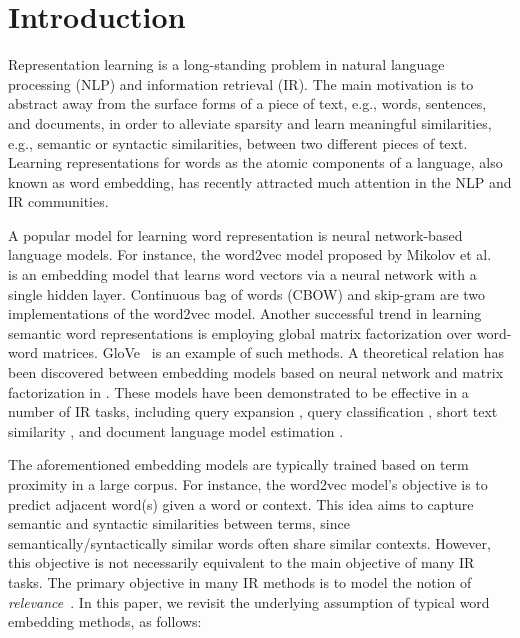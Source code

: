\documentclass[sigconf]{acmart}
\begin{document}

\maketitle

\section{Introduction}
\label{sec:intro}
Representation learning is a long-standing problem in natural language processing (NLP) and information retrieval (IR). The main motivation is to abstract away from the surface forms of a piece of text, e.g., words, sentences, and documents, in order to alleviate sparsity and learn meaningful similarities, e.g., semantic or syntactic similarities, between two different pieces of text. Learning representations for words as the atomic components of a language, also known as word embedding, has recently attracted much attention in the NLP and IR communities.

A popular model for learning word representation is neural network-based language models. For instance, the word2vec model proposed by Mikolov et al.~\cite{Mikolov:2013} is an embedding model that learns word vectors via a neural network with a single hidden layer. Continuous bag of words (CBOW) and skip-gram are two implementations of the word2vec model. Another successful trend in learning semantic word representations is employing global matrix factorization over word-word matrices. GloVe~\cite{Pennington:2014} is an example of such methods. A theoretical relation has been discovered between embedding models based on neural network and matrix factorization in \cite{Levy:2014}. These models have been demonstrated to be effective in a number of IR tasks, including query expansion \cite{Diaz:2016,Kuzi:2016,Zamani:2016:ICTIR:emb}, query classification \cite{Liu:2015,Zamani:2016:ICTIR:pqv}, short text similarity \cite{Kenter:2015}, and document language model estimation \cite{Ai:2016}.

The aforementioned embedding models are typically trained based on term proximity in a large corpus. For instance, the word2vec model's objective is to predict adjacent word(s) given a word or context. This idea aims to capture semantic and syntactic similarities between terms, since semantically/syntactically similar words often share similar contexts. However, this objective is not necessarily equivalent to the main objective of many IR tasks. The primary objective in many IR methods is to model the notion of \textit{relevance}~\cite{Lavrenko:2001,Saracevic:2016,Zhai:2003}. In this paper, we revisit the underlying assumption of typical word embedding methods, as follows:
\end{document}
